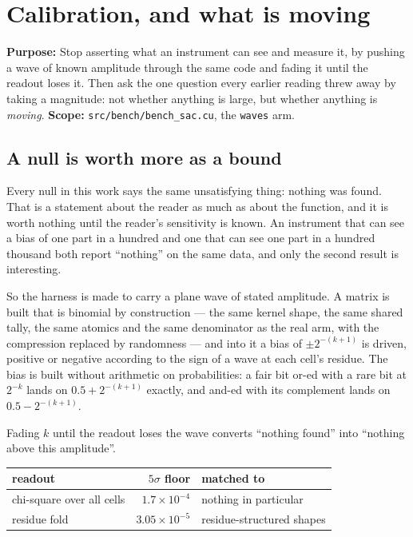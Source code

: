 \chapter{Calibration, and what is moving}

\textbf{Purpose:} Stop asserting what an instrument can see and measure it, by pushing a wave of
known amplitude through the same code and fading it until the readout loses it. Then ask the one
question every earlier reading threw away by taking a magnitude: not whether anything is large, but
whether anything is \emph{moving}. \textbf{Scope:}
\texttt{src/\allowbreak{}bench/\allowbreak{}bench\_\allowbreak{}sac.\allowbreak{}cu}, the
\texttt{waves} arm.

\section{A null is worth more as a bound}

Every null in this work says the same unsatisfying thing: nothing was found. That is a statement
about the reader as much as about the function, and it is worth nothing until the reader's
sensitivity is known. An instrument that can see a bias of one part in a hundred and one that can
see one part in a hundred thousand both report ``nothing'' on the same data, and only the second
result is interesting.

So the harness is made to carry a plane wave of stated amplitude. A matrix is built that is
binomial by construction --- the same kernel shape, the same shared tally, the same atomics and the
same denominator as the real arm, with the compression replaced by randomness --- and into it a
bias of \(\pm 2^{-(k+1)}\) is driven, positive or negative according to the sign of a wave at each
cell's residue. The bias is built without arithmetic on probabilities: a fair bit or-ed with a rare
bit at \(2^{-k}\) lands on \(0.5 + 2^{-(k+1)}\) exactly, and and-ed with its complement lands on
\(0.5 - 2^{-(k+1)}\).

Fading \(k\) until the readout loses the wave converts ``nothing found'' into ``nothing above this
amplitude''.

\begin{center}
\begin{tabular}{lrl}
\toprule
readout & \(5\sigma\) floor & matched to \\
\midrule
chi-square over all cells & \(1.7 \times 10^{-4}\) & nothing in particular \\
residue fold & \(3.05 \times 10^{-5}\) & residue-structured shapes \\
\bottomrule
\end{tabular}
\end{center}

